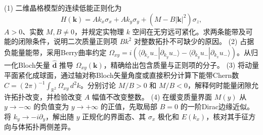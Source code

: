 (1) 二维晶格模型的连续低能正则化为
\[
H(\boldsymbol k)=A k_x\sigma_x+A k_y\sigma_y+(M-B|\boldsymbol k|^2)\sigma_z,
\]
\(A>0\)、实数 \(M,B\ne0\)，并规定实物理 \(k\) 空间在无穷远可紧化。求两条能带及可能的闭隙条件，说明二次质量正则项 \(B k^2\) 对整数拓扑不可缺少的原因。
(2) 占据负能量能带，采用Berry曲率约定 \(\Omega_{xy}=i(\langle\partial_{k_x}u_-|\partial_{k_y}u_-\rangle-\langle\partial_{k_y}u_-|\partial_{k_x}u_-\rangle)\)。从归一化Bloch矢量 \(\hat{\boldsymbol d}\) 推导 \(\Omega_{xy}(\boldsymbol k)\)，精确给出包含质量与正则项的分子。
(3) 将动量平面紧化成球面，通过轴对称Bloch矢量角度或直接积分计算下能带Chern数 \(C=(2\pi)^{-1}\int_{\mathbb R^2}\Omega_{xy}\,d^2k\)。分别讨论 \(M/B>0\) 和 \(M/B<0\)，解释何时能量闭隙允许拓扑改变，并检验改变 \(A\) 幅值不改变整数。
(4) 在缓变质量界面 \(M(y)\) 从 \(y\to-\infty\) 的负值变为 \(y\to+\infty\) 的正值，先取局部 \(B=0\) 的一阶Dirac边缘近似。将 \(k_y\to-i\partial_y\)，解出随 \(y\) 正规化的界面态、其 \(\sigma_x\) 极化和 \(E(k_x)\)，核对其手征方向与体拓扑两侧差异。
